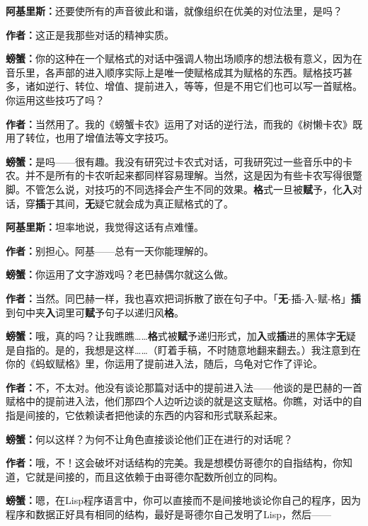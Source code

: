 \documentclass[
  12pt,
  twoside,
  openright,
  oldfontcommands,
]{memoir}
\newcommand{\kaitismall}[1]{{\kaitifamily\small #1}}
\newcommand{\heititext}[1]{{\heifamily\bfseries #1}}
\newcommand{\dialogname}[1]{{\heifamily\bfseries #1}}
\begin{document}
\dialogname{阿基里斯：}还要使所有的声音彼此和谐，就像组织在优美的对位法里，是吗？

\dialogname{作者：}这正是我那些对话的精神实质。

\dialogname{螃蟹：}你的这种在一个赋格式的对话中强调人物出场顺序的想法极有意义，因为在音乐里，各声部的进入顺序实际上是唯一使赋格成其为赋格的东西。赋格技巧甚多，诸如逆行、转位、增值、提前进入，等等，但是不用它们也可以写一首赋格。你运用这些技巧了吗？

\dialogname{作者：}当然用了。我的《螃蟹卡农》运用了对话的逆行法，而我的《树懒卡农》既用了转位，也用了增值法等文字技巧。

\dialogname{螃蟹：}是吗------很有趣。我没有研究过卡农式对话，可我研究过一些音乐中的卡农。并不是所有的卡农听起来都同样容易理解。当然，这是因为有些卡农写得很蹩脚。不管怎么说，对技巧的不同选择会产生不同的效果。\heititext{格}式一旦被\heititext{赋}予，化\heititext{入}对话，穿\heititext{插}于其间，\heititext{无}疑它就会成为真正赋格式的了。

\dialogname{阿基里斯：}坦率地说，我觉得这话有点难懂。

\dialogname{作者：}别担心。阿基------总有一天你能理解的。

\dialogname{螃蟹：}你运用了文字游戏吗？老巴赫偶尔就这么做。

\dialogname{作者：}当然。同巴赫一样，我也喜欢把词拆散了嵌在句子中。「\heititext{无}-插-入-赋-格」\heititext{插}到句中夹\heititext{入}词里可\heititext{赋}予句子以递归风\heititext{格}。

\dialogname{螃蟹：}哦，真的吗？让我瞧瞧\ldots\ldots{}\heititext{格}式被\heititext{赋}予递归形式，加\heititext{入}或\heititext{插}进的黑体字\heititext{无}疑是自指的。是的，我想是这样\ldots\ldots{}\kaitismall{（盯着手稿，不时随意地翻来翻去。）}我注意到在你的《蚂蚁赋格》里，你运用了提前进入法，随后，乌龟对它作了评论。

\dialogname{作者：}不，不太对。他没有谈论那篇对话中的提前进入法------他谈的是巴赫的一首赋格中的提前进入法，他们那四个人边听边谈的就是这支赋格。你瞧，对话中的自指是间接的，它依赖读者把他读的东西的内容和形式联系起来。

\dialogname{螃蟹：}何以这样？为何不让角色直接谈论他们正在进行的对话呢？

\dialogname{作者：}哦，不！这会破坏对话结构的完美。我是想模仿哥德尔的自指结构，你知道，它就是间接的，而且这依赖于由哥德尔配数所创立的同构。

\dialogname{螃蟹：}嗯，在Lisp程序语言中，你可以直接而不是间接地谈论你自己的程序，因为程序和数据正好具有相同的结构，最好是哥德尔自己发明了Lisp，然后------
\end{document}

